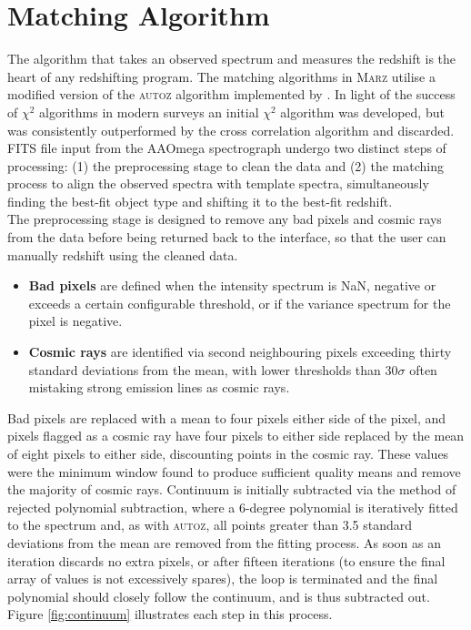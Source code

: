 \documentclass[iop]{emulateapj}
\newcommand{\autoz}{\textsc{autoz}}
\newcommand{\marz}{\textsc{Marz}}
\begin{document}
\section{Matching Algorithm}

The algorithm that takes an observed spectrum and measures the redshift is the heart of any redshifting program. The matching algorithms in \marz{} utilise a modified version of the \autoz{} algorithm implemented by \citet{baldry2014galaxy}. In light of the success of $\chi^2$ algorithms in modern surveys \citep{bolton2012} an initial $\chi^2$ algorithm was developed, but was consistently outperformed by the cross correlation algorithm and discarded. FITS file input from the AAOmega spectrograph undergo two distinct steps of processing: (1) the preprocessing stage to clean the data and (2) the matching process to align the observed spectra with template spectra, simultaneously finding the best-fit object type and shifting it to the best-fit redshift.\\

The preprocessing stage is designed to remove any bad pixels and cosmic rays from the data before being returned back to the interface, so that the user can manually redshift using the cleaned data.
\begin{itemize}
\item \textbf{Bad pixels} are defined when the intensity spectrum is NaN, negative or exceeds a certain configurable threshold, or if the variance spectrum for the pixel is negative.
\item \textbf{Cosmic rays} are identified via second neighbouring pixels exceeding thirty standard deviations from the mean, with lower thresholds than $30\sigma$ often mistaking strong emission lines as cosmic rays. 
\end{itemize}
Bad pixels are replaced with a mean to four pixels either side of the pixel, and pixels flagged as a cosmic ray have four pixels to either side replaced by the mean of eight pixels to either side, discounting points in the cosmic ray. These values were the minimum window found to produce sufficient quality means and remove the majority of cosmic rays. Continuum is initially subtracted via the method of rejected polynomial subtraction, where a 6-degree polynomial is iteratively fitted to the spectrum and, as with \autoz{}, all points greater than 3.5 standard deviations from the mean are removed from the fitting process. As soon as an iteration discards no extra pixels, or after fifteen iterations (to ensure the final array of values is not excessively spares), the loop is terminated and the final polynomial should closely follow the continuum, and is thus subtracted out. Figure \ref{fig:continuum} illustrates each step in this process.\\
\end{document}
